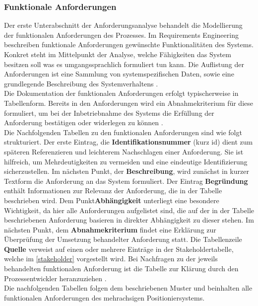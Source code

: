 \documentclass[../../../Bachelorarbeit.tex]{subfiles}
\begin{document}
\subsubsection{Funktionale Anforderungen}
Der erste Unterabschnitt der Anforderungsanalyse behandelt die Modellierung der funktionalen Anforderungen des Prozesses. Im Requirements Engineering beschreiben funktionale Anforderungen gewünschte Funktionalitäten des Systems. Konkret steht im Mittelpunkt der Analyse, welche Fähigkeiten das System besitzen soll \bzw was es umgangssprachlich formuliert tun kann. Die Auflistung der Anforderungen ist eine Sammlung von systemspezifischen Daten, sowie eine grundlegende Beschreibung des Systemverhaltens \cite[338]{Lauber1999}. \\
Die Dokumentation der funktionalen Anforderungen erfolgt typischerweise in Tabellenform. Bereits in den Anforderungen wird ein Abnahmekriterium für diese formuliert, um bei der Inbetriebnahme des Systems die Erfüllung der Anforderung bestätigen oder widerlegen zu können \cite[55]{Kleuker2013}.\\
Die Nachfolgenden Tabellen zu den funktionalen Anforderungen sind wie folgt strukturiert. Der erste Eintrag, die \textbf{Identifikationsnummer} (kurz \acs{id}) dient zum späteren Referenzieren und leichterem Nachschlagen einer Anforderung. Sie ist hilfreich, um Mehrdeutigkeiten zu vermeiden und eine eindeutige Identifizierung sicherzustellen. Im nächsten Punkt, der \textbf{Beschreibung}, wird zunächst in kurzer Textform die Anforderung an das System formuliert. Der Eintrag \textbf{Begründung} enthält Informationen zur Relevanz der Anforderung, die in der Tabelle beschrieben wird. Dem Punkt\textbf{Abhängigkeit} unterliegt eine besondere Wichtigkeit, da hier alle Anforderungen aufgelistet sind, die auf der in der Tabelle beschriebenen Anforderung basieren \bzw in direkter Abhängigkeit zu dieser stehen. Im nächsten Punkt, dem \textbf{Abnahmekriterium} findet eine Erklärung zur Überprüfung der Umsetzung behandelter Anforderung statt. Die Tabellenzeile \textbf{Quelle} verweist auf einen oder mehrere Einträge in der Stakeholdertabelle, welche im \autoref{stakeholder} vorgestellt wird. Bei Nachfragen zu der jeweils behandelten funktionalen Anforderung ist die Tabelle zur Klärung durch den Prozessentwickler heranzuziehen \cite[56]{Kleuker2013}. \\
Die nachfolgenden Tabellen folgen dem beschriebenen Muster und beinhalten alle funktionalen Anforderungen des mehrachsigen Positioniersystems.\\  %
\end{document}
